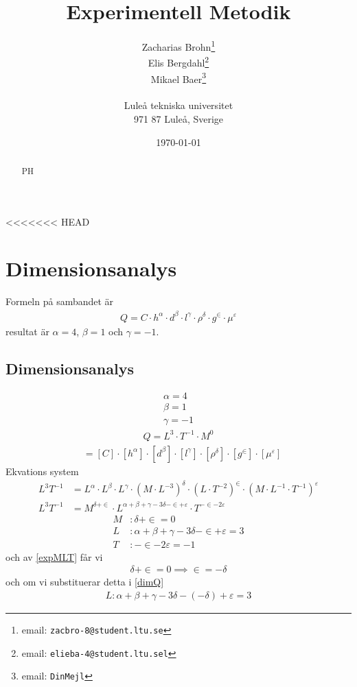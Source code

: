 \documentclass[a4paper,12pt]{article}
\title{Experimentell Metodik}
\author{Zacharias Brohn\thanks{email: \texttt{zacbro-8@student.ltu.se}}\\  
        Elis Bergdahl\thanks{email: \texttt{elieba-4@student.ltu.sel}} \\
        Mikael Baer\thanks{email: \texttt{DinMejl}} \\
        ~ \\
        Luleå tekniska universitet \\ 
        971 87 Luleå, Sverige}
\date{\today}
\begin{document}
%
\begin{abstract}
    PH
\end{abstract}
%
<<<<<<< HEAD
\section{Dimensionsanalys}
Formeln på sambandet är
\begin{align}
    Q = C \cdot h^\alpha \cdot d^\beta \cdot l^\gamma \cdot \rho^\delta \cdot g^\in \cdot \mu^\varepsilon
\end{align}
resultat är $\alpha = 4$, $\beta = 1$ och $\gamma = -1$.
%
\subsection{Dimensionsanalys}
\begin{align}
    \alpha = 4 \\
    \beta = 1 \\
    \gamma = -1
\end{align}
\begin{align}\label{dimQ}
    Q = L^3 \cdot T^{-1} \cdot M^0
\end{align}
\begin{align}
    [Q] &= [C] \cdot [h^\alpha] \cdot [d^\beta] \cdot [l^\gamma] \cdot [\rho^\delta] \cdot [g^\in] \cdot [\mu^\varepsilon]
\end{align}
Ekvations system
\begin{align}
    L^3T^{-1} &= L^{\alpha} \cdot L^{\beta} \cdot L^{\gamma} \cdot (M \cdot L^{-3})^{\delta} \cdot (L \cdot T^{-2})^{\in} \cdot (M \cdot L^{-1} \cdot T^{-1})^{\varepsilon} \\
    L^3T^{-1} &= M^{\delta + \in} \cdot L^{\alpha + \beta + \gamma - 3\delta - \in + \varepsilon} \cdot T^{-\in - 2\varepsilon}
\end{align}
\begin{align}\label{expMLT}
    M&: \delta + \in = 0 \\
    L&: \alpha + \beta + \gamma - 3\delta - \in + \varepsilon = 3 \\
    T&: -\in - 2\varepsilon = -1
\end{align}
och av \ref{expMLT} får vi
\begin{align}
    \delta + \in = 0 \implies \in = - \delta
\end{align}
och om vi substituerar detta i \ref{dimQ}
\begin{align}
    L: \alpha + \beta + \gamma - 3\delta - (-\delta) + \varepsilon = 3
\end{align}
\end{document}
